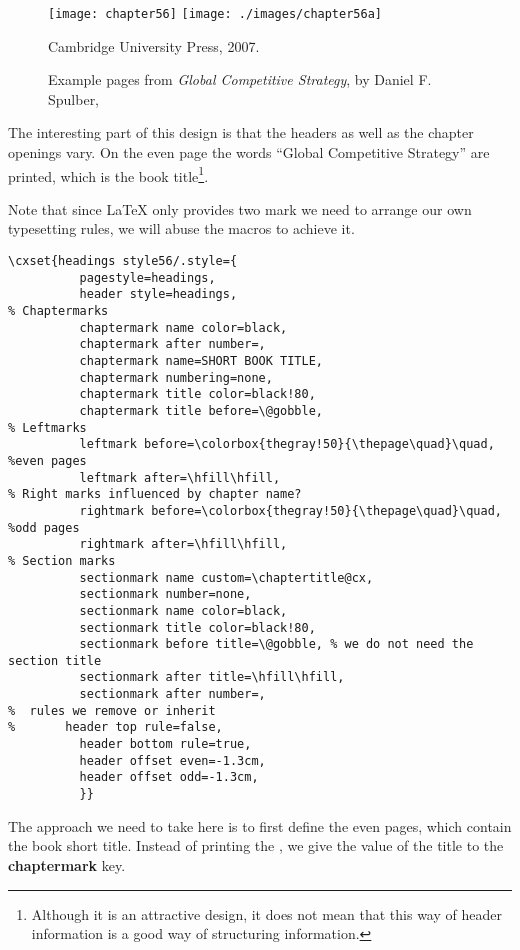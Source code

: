 \begin{figure}[hp]
\centering
\texttt{[image: chapter56]}\vspace{0.5\baselineskip}
\texttt{[image: ./images/chapter56a]}
\caption{Example pages from \textit{Global Competitive Strategy}, by Daniel F. Spulber,} Cambridge University Press, 2007.
\label{globalstrategy}
\end{figure}

The interesting part of this design is that the headers as well as the chapter openings vary. On the even page the words ``Global Competitive Strategy'' are printed, which is the book title\footnote{Although it is an attractive design, it does not mean that this way of header information is a good way of structuring information.}.

Note that since LaTeX only provides two mark we need to arrange our own typesetting rules, we will abuse the macros to achieve it.

\begin{tcolorbox}
\begin{lstlisting}
\cxset{headings style56/.style={
          pagestyle=headings,
          header style=headings,
% Chaptermarks
          chaptermark name color=black,
          chaptermark after number=,
          chaptermark name=SHORT BOOK TITLE,
          chaptermark numbering=none,
          chaptermark title color=black!80,
          chaptermark title before=\@gobble,
% Leftmarks
          leftmark before=\colorbox{thegray!50}{\thepage\quad}\quad, %even pages
          leftmark after=\hfill\hfill,
% Right marks influenced by chapter name?
          rightmark before=\colorbox{thegray!50}{\thepage\quad}\quad, %odd pages
          rightmark after=\hfill\hfill,
% Section marks
          sectionmark name custom=\chaptertitle@cx,
          sectionmark number=none,
          sectionmark name color=black,
          sectionmark title color=black!80,
          sectionmark before title=\@gobble, % we do not need the section title
          sectionmark after title=\hfill\hfill,
          sectionmark after number=,
%  rules we remove or inherit
%       header top rule=false,
          header bottom rule=true,
          header offset even=-1.3cm,
          header offset odd=-1.3cm,
          }}
\end{lstlisting}
\end{tcolorbox}

The approach we need to take here is to first define the even pages, which contain the book short title. Instead of printing the , we give the value of the title to the \textbf{chaptermark} key.

